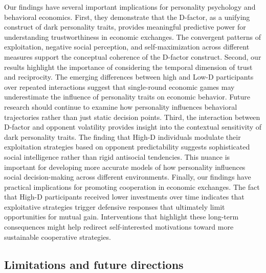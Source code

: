 \documentclass[
]{article}
\begin{document}
Our findings have several important implications for personality psychology and behavioral economics. First, they demonstrate that the D-factor, as a unifying construct of dark personality traits, provides meaningful predictive power for understanding trustworthiness in economic exchanges. The convergent patterns of exploitation, negative social perception, and self-maximization across different measures support the conceptual coherence of the D-factor construct.
Second, our results highlight the importance of considering the temporal dimension of trust and reciprocity. The emerging differences between high and Low-D participants over repeated interactions suggest that single-round economic games may underestimate the influence of personality traits on economic behavior. Future research should continue to examine how personality influences behavioral trajectories rather than just static decision points.
Third, the interaction between D-factor and opponent volatility provides insight into the contextual sensitivity of dark personality traits. The finding that High-D individuals modulate their exploitation strategies based on opponent predictability suggests sophisticated social intelligence rather than rigid antisocial tendencies. This nuance is important for developing more accurate models of how personality influences social decision-making across different environments.
Finally, our findings have practical implications for promoting cooperation in economic exchanges. The fact that High-D participants received lower investments over time indicates that exploitative strategies trigger defensive responses that ultimately limit opportunities for mutual gain. Interventions that highlight these long-term consequences might help redirect self-interested motivations toward more sustainable cooperative strategies.

\subsection{Limitations and future directions}\label{limitations-and-future-directions}
\end{document}
